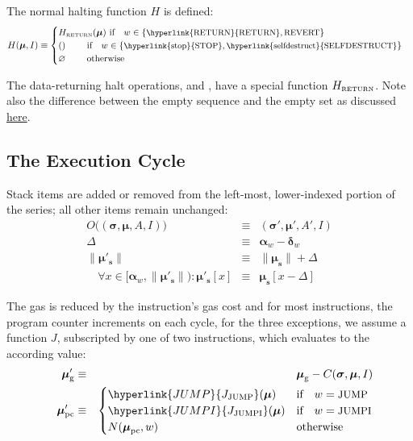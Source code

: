 \documentclass[9pt,oneside]{amsart}
\begin{document}
\begin{multicols}{2}
The normal halting function $H$ is defined:
\begin{equation}
H(\boldsymbol{\mu}, I) \equiv \begin{cases}
H_{\text{\tiny RETURN}}(\boldsymbol{\mu}) \ \text{if} \quad w \in \{\text{\small \hyperlink{RETURN}{RETURN}}, \text{\small REVERT}\} &\\
() \quad\quad\ \text{if} \quad w \in \{ \text{\small \hyperlink{stop}{STOP}}, \text{\small \hyperlink{selfdestruct}{SELFDESTRUCT}} \} &\\
\varnothing \quad\quad\ \text{otherwise}&
\end{cases}
\end{equation}

The data-returning halt operations, \hyperlink{RETURN}{} and , have a special function $H_{\text{\tiny RETURN}}$. Note also the difference between the empty sequence and the empty set as discussed \hyperlink{empty_sequence_vs_empty_set}{here}.

\subsection{The Execution Cycle}

Stack items are added or removed from the left-most, lower-indexed portion of the series; all other items remain unchanged:
\begin{eqnarray}
O\big((\boldsymbol{\sigma}, \boldsymbol{\mu}, A, I)\big) & \equiv & (\boldsymbol{\sigma}', \boldsymbol{\mu}', A', I) \\
\Delta & \equiv & \mathbf{\alpha}_{w} - \mathbf{\delta}_{w} \\
\lVert\boldsymbol{\mu}'_{\mathbf{s}}\rVert & \equiv & \lVert\boldsymbol{\mu}_{\mathbf{s}}\rVert + \Delta \\
\quad \forall x \in [\mathbf{\alpha}_{w}, \lVert\boldsymbol{\mu}'_{\mathbf{s}}\rVert): \boldsymbol{\mu}'_{\mathbf{s}}[x] & \equiv & \boldsymbol{\mu}_{\mathbf{s}}[x-\Delta]
\end{eqnarray}

The gas is reduced by the instruction's gas cost and for most instructions, the program counter increments on each cycle, for the three exceptions, we assume a function $J$, subscripted by one of two instructions, which evaluates to the according value:
\begin{eqnarray}
\quad \boldsymbol{\mu}'_{\mathrm{g}} & \equiv & \boldsymbol{\mu}_{\mathrm{g}} - C(\boldsymbol{\sigma}, \boldsymbol{\mu}, I) \label{eq:mu_pc}\\
\quad \boldsymbol{\mu}'_{\mathrm{pc}} & \equiv & \begin{cases}
\hyperlink{JUMP}{J_{\text{JUMP}}}(\boldsymbol{\mu}) & \text{if} \quad w = \text{\small JUMP} \\
\hyperlink{JUMPI}{J_{\text{JUMPI}}}(\boldsymbol{\mu}) & \text{if} \quad w = \text{\small JUMPI} \\
N(\boldsymbol{\mu}_{\mathrm{pc}}, w) & \text{otherwise}
\end{cases}
\end{eqnarray}


\end{multicols}
\end{document}
